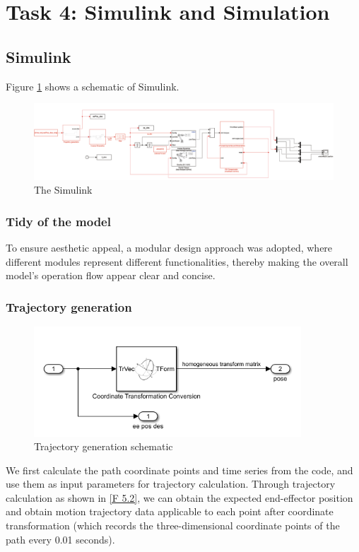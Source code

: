 \section{Task 4: Simulink and Simulation}
\FloatBarrier %

\subsection{Simulink}
Figure \ref{F 5.1} shows a schematic of Simulink.
\begin{figure}[htp]
    \centering
    \includegraphics[width=17cm]{./fig/sim.jpg}
    \caption{The Simulink}
    \label{F 5.1}
\end{figure}

\subsubsection*{Tidy of the model}
To ensure aesthetic appeal, a modular design approach was adopted, where different modules represent different functionalities, thereby making the overall model's operation flow appear clear and concise.

\subsubsection*{Trajectory generation}

\begin{figure}[htp]
    \centering
    \includegraphics[width=10cm]{./fig/traj.png}
    \caption{Trajectory generation schematic}
    \label{F 5.2}
\end{figure}

We first calculate the path coordinate points and time series from the code, and use them as input parameters for trajectory calculation. Through trajectory calculation as shown in \autoref{F 5.2}, we can obtain the expected end-effector position and obtain motion trajectory data applicable to each point after coordinate transformation (which records the three-dimensional coordinate points of the path every 0.01 seconds).


